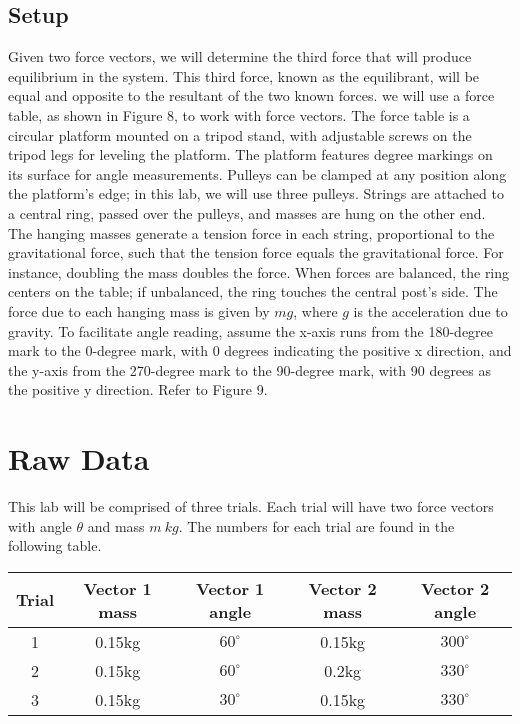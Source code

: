 \documentclass{report}
\begin{document}
    \subsection{Setup}
    \bigbreak \noindent 
    Given two force vectors, we will determine the third force that will produce equilibrium in the system. This third force, known as the equilibrant, will be equal and opposite to the resultant of the two known forces. we will use a force table, as shown in Figure 8, to work with force vectors. The force table is a circular platform mounted on a tripod stand, with adjustable screws on the tripod legs for leveling the platform. The platform features degree markings on its surface for angle measurements. Pulleys can be clamped at any position along the platform's edge; in this lab, we will use three pulleys. Strings are attached to a central ring, passed over the pulleys, and masses are hung on the other end.
    \bigbreak \noindent 
    The hanging masses generate a tension force in each string, proportional to the gravitational force, such that the tension force equals the gravitational force. For instance, doubling the mass doubles the force. When forces are balanced, the ring centers on the table; if unbalanced, the ring touches the central post's side. The force due to each hanging mass is given by \(mg\), where \(g\) is the acceleration due to gravity. To facilitate angle reading, assume the x-axis runs from the 180-degree mark to the 0-degree mark, with 0 degrees indicating the positive x direction, and the y-axis from the 270-degree mark to the 90-degree mark, with 90 degrees as the positive y direction. Refer to Figure 9.

    \pagebreak 
    \section{Raw Data}
    \bigbreak \noindent 
    This lab will be comprised of three trials. Each trial will have two force vectors with angle $\theta$ and mass $m\ kg$. The numbers for each trial are found in the following table.
    \bigbreak \noindent 
    \begin{center}
        \begin{tabular}{c|c|c|c|c}
            Trial & Vector 1 mass & Vector 1 angle & Vector 2 mass & Vector 2 angle \\
            \hline
            1 & 0.15kg & $60^{\circ}$ & 0.15kg & $300^{\circ}$\\
            2 & 0.15kg & $60^{\circ}$ & 0.2kg & $330^{\circ}$\\
            3 & 0.15kg & $30^{\circ}$ & 0.15kg & $330^{\circ}$
        \end{tabular}
    \end{center}
    \bigbreak \noindent 
\end{document}
